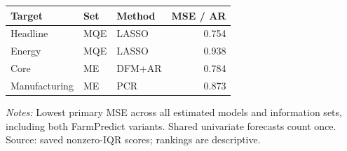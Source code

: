 \begin{threeparttable}
\begin{tabular}{lllr}
\toprule
Target & Set & Method & MSE / AR \\
\midrule
Headline & MQE & LASSO & 0.754 \\
Energy & MQE & LASSO & 0.938 \\
Core & ME & DFM+AR & 0.784 \\
Manufacturing & ME & PCR & 0.873 \\
\bottomrule
\end{tabular}
\begin{tablenotes}[flushleft]\footnotesize
\item \textit{Notes:} Lowest primary MSE across all estimated models and information sets, including both FarmPredict variants. Shared univariate forecasts count once. Source: saved nonzero-IQR scores; rankings are descriptive.
\end{tablenotes}
\end{threeparttable}
